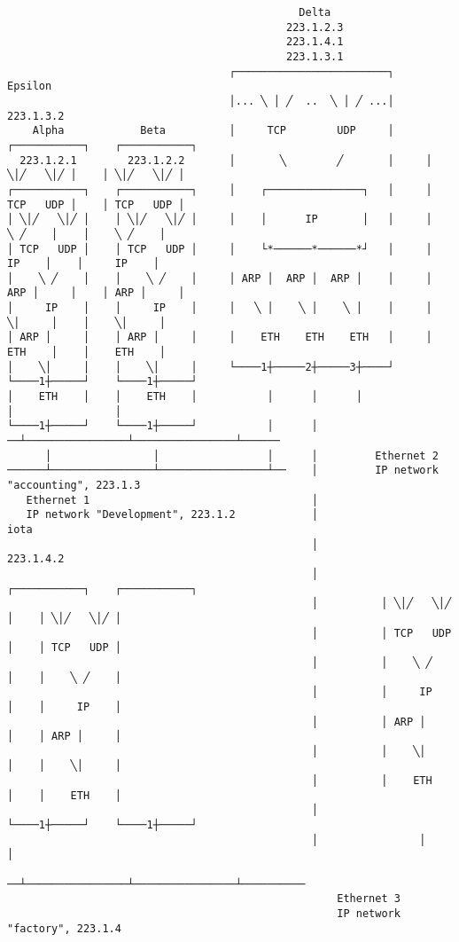 \documentclass[varwidth=30cm,crop]{standalone}
\begin{document}
\begin{verbatim}
                                              Delta
                                            223.1.2.3
                                            223.1.4.1
                                            223.1.3.1
                                   ┌────────────────────────┐                         Epsilon
                                   │... ╲ │ ╱  ..  ╲ │ ╱ ...│                        223.1.3.2
    Alpha            Beta          │     TCP        UDP     │     ┌───────────┐    ┌───────────┐
  223.1.2.1        223.1.2.2       │       ╲        ╱       │     │ ╲│╱   ╲│╱ │    │ ╲│╱   ╲│╱ │
┌───────────┐    ┌───────────┐     │    ┌───────────────┐   │     │ TCP   UDP │    │ TCP   UDP │
│ ╲│╱   ╲│╱ │    │ ╲│╱   ╲│╱ │     │    │      IP       │   │     │    ╲ ╱    │    │    ╲ ╱    │
│ TCP   UDP │    │ TCP   UDP │     │    └*──────*──────*┘   │     │     IP    │    │     IP    │
│    ╲ ╱    │    │    ╲ ╱    │     │ ARP │  ARP │  ARP │    │     │ ARP │     │    │ ARP │     │
│     IP    │    │     IP    │     │   ╲ │    ╲ │    ╲ │    │     │    ╲│     │    │    ╲│     │
│ ARP │     │    │ ARP │     │     │    ETH    ETH    ETH   │     │    ETH    │    │    ETH    │
│    ╲│     │    │    ╲│     │     └────1┼─────2┼─────3┼────┘     └────1┼─────┘    └────1┼─────┘
│    ETH    │    │    ETH    │           │      │      │                │                │
└────1┼─────┘    └────1┼─────┘           │      │    ──┴────────────────┴────────────────┴──────
      │                │                 │      │         Ethernet 2
──────┴────────────────┴─────────────────┴──    │         IP network "accounting", 223.1.3
   Ethernet 1                                   │
   IP network "Development", 223.1.2            │                               iota
                                                │                             223.1.4.2
                                                │          ┌───────────┐    ┌───────────┐
                                                │          │ ╲│╱   ╲│╱ │    │ ╲│╱   ╲│╱ │
                                                │          │ TCP   UDP │    │ TCP   UDP │
                                                │          │    ╲ ╱    │    │    ╲ ╱    │
                                                │          │     IP    │    │     IP    │
                                                │          │ ARP │     │    │ ARP │     │
                                                │          │    ╲│     │    │    ╲│     │
                                                │          │    ETH    │    │    ETH    │
                                                │          └────1┼─────┘    └────1┼─────┘
                                                │                │                │
                                              ──┴────────────────┴────────────────┴──────────
                                                    Ethernet 3
                                                    IP network "factory", 223.1.4
\end{verbatim}
\end{document}
